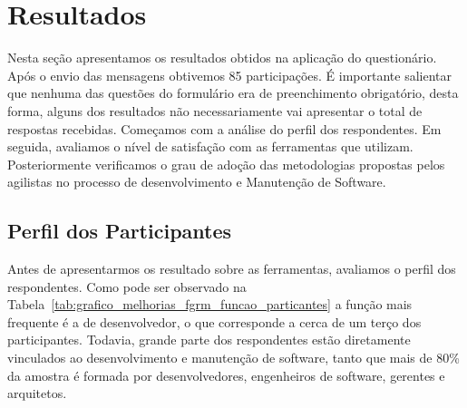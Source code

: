 \section{Resultados}\label{sec:analise_dados}

Nesta seção apresentamos os resultados obtidos na aplicação do questionário.
Após o envio das mensagens obtivemos 85 participações. É importante salientar
que nenhuma das questões do formulário era de preenchimento obrigatório, desta
forma, alguns dos resultados não necessariamente vai apresentar o total de
respostas recebidas. Começamos com a análise do perfil dos respondentes. Em
seguida, avaliamos o nível de satisfação com as ferramentas que utilizam.
Posteriormente verificamos o grau de adoção das metodologias propostas pelos
agilistas no processo de desenvolvimento e Manutenção de Software.

\subsection{Perfil dos Participantes}\label{sub:pesquisa_prof_perfil_dos_participantes}

Antes de apresentarmos os resultado sobre as ferramentas, avaliamos o perfil dos
respondentes. Como pode ser observado na
Tabela~\ref{tab:grafico_melhorias_fgrm_funcao_particantes} a função mais
frequente é a de desenvolvedor, o que corresponde a cerca de um terço dos
participantes. Todavia, grande parte dos respondentes estão diretamente
vinculados ao desenvolvimento e manutenção de software, tanto que mais de 80\%
da amostra é formada por desenvolvedores, engenheiros de software, gerentes e
arquitetos.

\begin{table}[htpb]
\centering
{}
\caption{Função desempenhada pelos participantes}\label{tab:grafico_melhorias_fgrm_funcao_particantes}
\end{table}

